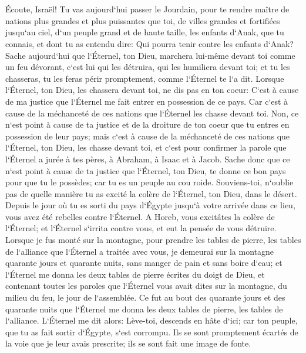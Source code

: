 \chapter{}

\verse Écoute, Israël! Tu vas aujourd`hui passer le Jourdain, pour te rendre maître de nations plus grandes et plus puissantes que toi, de villes grandes et fortifiées jusqu`au ciel, 
\verse d`un peuple grand et de haute taille, les enfants d`Anak, que tu connais, et dont tu as entendu dire: Qui pourra tenir contre les enfants d`Anak? 
\verse Sache aujourd`hui que l`Éternel, ton Dieu, marchera lui-même devant toi comme un feu dévorant, c`est lui qui les détruira, qui les humiliera devant toi; et tu les chasseras, tu les feras périr promptement, comme l`Éternel te l`a dit. 
\verse Lorsque l`Éternel, ton Dieu, les chassera devant toi, ne dis pas en ton coeur: C`est à cause de ma justice que l`Éternel me fait entrer en possession de ce pays. Car c`est à cause de la méchanceté de ces nations que l`Éternel les chasse devant toi. 
\verse Non, ce n`est point à cause de ta justice et de la droiture de ton coeur que tu entres en possession de leur pays; mais c`est à cause de la méchanceté de ces nations que l`Éternel, ton Dieu, les chasse devant toi, et c`est pour confirmer la parole que l`Éternel a jurée à tes pères, à Abraham, à Isaac et à Jacob. 
\verse Sache donc que ce n`est point à cause de ta justice que l`Éternel, ton Dieu, te donne ce bon pays pour que tu le possèdes; car tu es un peuple au cou roide. 
\verse Souviens-toi, n`oublie pas de quelle manière tu as excité la colère de l`Éternel, ton Dieu, dans le désert. Depuis le jour où tu es sorti du pays d`Égypte jusqu`à votre arrivée dans ce lieu, vous avez été rebelles contre l`Éternel. 
\verse A Horeb, vous excitâtes la colère de l`Éternel; et l`Éternel s`irrita contre vous, et eut la pensée de vous détruire. 
\verse Lorsque je fus monté sur la montagne, pour prendre les tables de pierre, les tables de l`alliance que l`Éternel a traitée avec vous, je demeurai sur la montagne quarante jours et quarante nuits, sans manger de pain et sans boire d`eau; 
\verse et l`Éternel me donna les deux tables de pierre écrites du doigt de Dieu, et contenant toutes les paroles que l`Éternel vous avait dites sur la montagne, du milieu du feu, le jour de l`assemblée. 
\verse Ce fut au bout des quarante jours et des quarante nuits que l`Éternel me donna les deux tables de pierre, les tables de l`alliance. 
\verse L`Éternel me dit alors: Lève-toi, descends en hâte d`ici; car ton peuple, que tu as fait sortir d`Égypte, s`est corrompu. Ils se sont promptement écartés de la voie que je leur avais prescrite; ils se sont fait une image de fonte. 
